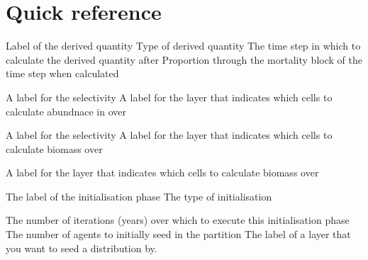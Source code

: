 \section{Quick reference\label{sec:quick-reference}}
\par
{} {Label of the derived quantity}
 {Type of derived quantity}
 {The time step in which to calculate the derived quantity after}
 {Proportion through the mortality block of the time step when calculated}
\par\textbf{}\par
{} {A label for the selectivity}
 {A label for the layer that indicates which cells to calculate abundnace in over}
\par\textbf{}\par
{} {A label for the selectivity}
 {A label for the layer that indicates which cells to calculate biomass over}
\par\textbf{}\par
\par\textbf{}\par
{} {A label for the layer that indicates which cells to calculate biomass over}
\par\par
{} {The label of the initialisation phase}
 {The type of initialisation}
\par\textbf{}\par
{} {The number of iterations (years) over which to execute this initialisation phase}
 {The number of agents to initially seed in the partition}
 {The label of a layer that you want to seed a distribution by.}
\par\par
\par\textbf{}\par
